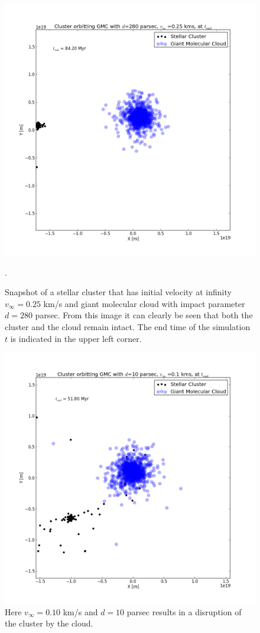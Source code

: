 \documentclass{aa}
\begin{document}
\begin{figure}[h!]
    \centering
    \includegraphics[width=\hsize]{img/v_25_d_280.png}
    \caption{Snapshot of a stellar cluster that has initial velocity at infinity $v_\infty = 0.25$ km/s and giant molecular cloud with impact parameter $d = 280$ parsec. From this image it can clearly be seen that both the cluster and the cloud remain intact. The end time of the simulation $t$ is indicated in the upper left corner.}\label{fig:v_25_d_280}.
\end{figure}
\begin{figure}[h!]
    \centering
    \includegraphics[width=\hsize]{img/v_10_d_10.png}
    \caption{Here $v_\infty = 0.10$ km/s and $d = 10$ parsec results in a disruption of the cluster by the cloud.}\label{fig:v_10_d_10}
\end{figure}
\end{document}
